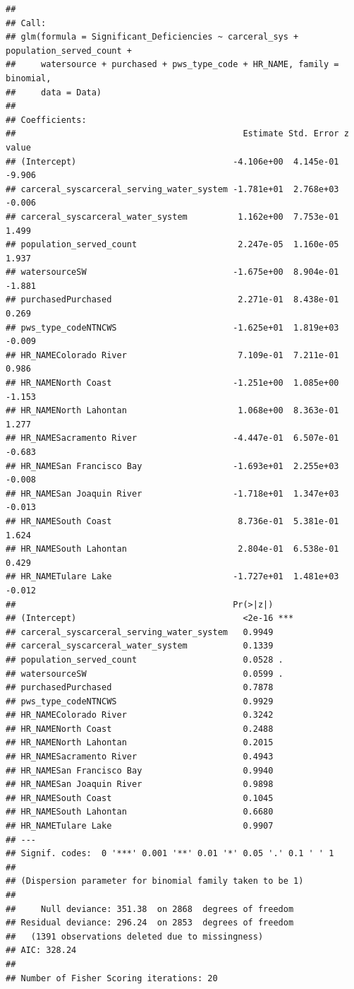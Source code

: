 \documentclass[
]{article}
\begin{document}
\begin{verbatim}
## 
## Call:
## glm(formula = Significant_Deficiencies ~ carceral_sys + population_served_count + 
##     watersource + purchased + pws_type_code + HR_NAME, family = binomial, 
##     data = Data)
## 
## Coefficients:
##                                             Estimate Std. Error z value
## (Intercept)                               -4.106e+00  4.145e-01  -9.906
## carceral_syscarceral_serving_water_system -1.781e+01  2.768e+03  -0.006
## carceral_syscarceral_water_system          1.162e+00  7.753e-01   1.499
## population_served_count                    2.247e-05  1.160e-05   1.937
## watersourceSW                             -1.675e+00  8.904e-01  -1.881
## purchasedPurchased                         2.271e-01  8.438e-01   0.269
## pws_type_codeNTNCWS                       -1.625e+01  1.819e+03  -0.009
## HR_NAMEColorado River                      7.109e-01  7.211e-01   0.986
## HR_NAMENorth Coast                        -1.251e+00  1.085e+00  -1.153
## HR_NAMENorth Lahontan                      1.068e+00  8.363e-01   1.277
## HR_NAMESacramento River                   -4.447e-01  6.507e-01  -0.683
## HR_NAMESan Francisco Bay                  -1.693e+01  2.255e+03  -0.008
## HR_NAMESan Joaquin River                  -1.718e+01  1.347e+03  -0.013
## HR_NAMESouth Coast                         8.736e-01  5.381e-01   1.624
## HR_NAMESouth Lahontan                      2.804e-01  6.538e-01   0.429
## HR_NAMETulare Lake                        -1.727e+01  1.481e+03  -0.012
##                                           Pr(>|z|)    
## (Intercept)                                 <2e-16 ***
## carceral_syscarceral_serving_water_system   0.9949    
## carceral_syscarceral_water_system           0.1339    
## population_served_count                     0.0528 .  
## watersourceSW                               0.0599 .  
## purchasedPurchased                          0.7878    
## pws_type_codeNTNCWS                         0.9929    
## HR_NAMEColorado River                       0.3242    
## HR_NAMENorth Coast                          0.2488    
## HR_NAMENorth Lahontan                       0.2015    
## HR_NAMESacramento River                     0.4943    
## HR_NAMESan Francisco Bay                    0.9940    
## HR_NAMESan Joaquin River                    0.9898    
## HR_NAMESouth Coast                          0.1045    
## HR_NAMESouth Lahontan                       0.6680    
## HR_NAMETulare Lake                          0.9907    
## ---
## Signif. codes:  0 '***' 0.001 '**' 0.01 '*' 0.05 '.' 0.1 ' ' 1
## 
## (Dispersion parameter for binomial family taken to be 1)
## 
##     Null deviance: 351.38  on 2868  degrees of freedom
## Residual deviance: 296.24  on 2853  degrees of freedom
##   (1391 observations deleted due to missingness)
## AIC: 328.24
## 
## Number of Fisher Scoring iterations: 20
\end{verbatim}
\end{document}

